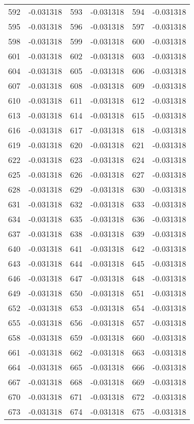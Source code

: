 \documentclass[12pt]{article}
\begin{document}
\begin{longtable}{@{}cc|cc|cc@{}}
592 & -0.031318 & 593 & -0.031318 & 594 & -0.031318 \\
595 & -0.031318 & 596 & -0.031318 & 597 & -0.031318 \\
598 & -0.031318 & 599 & -0.031318 & 600 & -0.031318 \\
601 & -0.031318 & 602 & -0.031318 & 603 & -0.031318 \\
604 & -0.031318 & 605 & -0.031318 & 606 & -0.031318 \\
607 & -0.031318 & 608 & -0.031318 & 609 & -0.031318 \\
610 & -0.031318 & 611 & -0.031318 & 612 & -0.031318 \\
613 & -0.031318 & 614 & -0.031318 & 615 & -0.031318 \\
616 & -0.031318 & 617 & -0.031318 & 618 & -0.031318 \\
619 & -0.031318 & 620 & -0.031318 & 621 & -0.031318 \\
622 & -0.031318 & 623 & -0.031318 & 624 & -0.031318 \\
625 & -0.031318 & 626 & -0.031318 & 627 & -0.031318 \\
628 & -0.031318 & 629 & -0.031318 & 630 & -0.031318 \\
631 & -0.031318 & 632 & -0.031318 & 633 & -0.031318 \\
634 & -0.031318 & 635 & -0.031318 & 636 & -0.031318 \\
637 & -0.031318 & 638 & -0.031318 & 639 & -0.031318 \\
640 & -0.031318 & 641 & -0.031318 & 642 & -0.031318 \\
643 & -0.031318 & 644 & -0.031318 & 645 & -0.031318 \\
646 & -0.031318 & 647 & -0.031318 & 648 & -0.031318 \\
649 & -0.031318 & 650 & -0.031318 & 651 & -0.031318 \\
652 & -0.031318 & 653 & -0.031318 & 654 & -0.031318 \\
655 & -0.031318 & 656 & -0.031318 & 657 & -0.031318 \\
658 & -0.031318 & 659 & -0.031318 & 660 & -0.031318 \\
661 & -0.031318 & 662 & -0.031318 & 663 & -0.031318 \\
664 & -0.031318 & 665 & -0.031318 & 666 & -0.031318 \\
667 & -0.031318 & 668 & -0.031318 & 669 & -0.031318 \\
670 & -0.031318 & 671 & -0.031318 & 672 & -0.031318 \\
673 & -0.031318 & 674 & -0.031318 & 675 & -0.031318 \\

\end{longtable}
\end{document}
